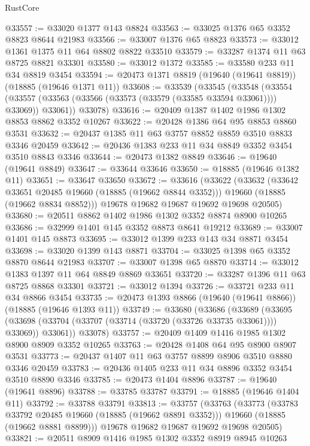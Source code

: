 \begin{lexlean}{RustCore}
\begin{coremodule}
@33557 := @33020 @1377 @143 @8824
@33563 := @33025 @1376 @65 @3352 @8823 @8644 @21983
@33566 := @33007 @1376 @65 @8823
@33573 := @33012 @1361 @1375 @11 @64 @8802 @8822 @33510
@33579 := @33287 @1374 @11 @63 @8725 @8821 @33301
@33580 := @33012 @1372
@33585 := @33580 @233 @11 @34 @8819 @3454
@33594 := @20473 @1371 @8819 (@19640 (@19641 @8819)) (@18885 (@19646 @1371 @11))
@33608 := @33539
    (@33545
      (@33548
        (@33554 (@33557 (@33563 (@33566 (@33573 (@33579 (@33585 @33594 @33061)))) @33069)) @33061))
      @33078)
@33616 := @20409 @1387 @1402 @1986 @1302 @8853 @8862 @3352 @10267
@33622 := @20428 @1386 @64 @95 @8853 @8860 @3531
@33632 := @20437 @1385 @11 @63 @3757 @8852 @8859 @3510 @8833 @3346 @20459
@33642 := @20436 @1383 @233 @11 @34 @8849 @3352 @3454 @3510 @8843 @3346
@33644 := @20473 @1382 @8849
@33646 := @19640 (@19641 @8849)
@33647 := @33644 @33646
@33650 := @18885 (@19646 @1382 @11)
@33651 := @33647 @33650
@33672 := @33616
    (@33622
      (@33632
        (@33642 @33651 @20485 @19660 (@18885 (@19662 @8844 @3352)))
        @19660
        (@18885 (@19662 @8834 @8852)))
      @19678
      @19682
      @19687
      @19692
      @19698
      @20505)
@33680 := @20511 @8862 @1402 @1986 @1302 @3352 @8874 @8900 @10265
@33686 := @32999 @1401 @145 @3352 @8873 @8641 @19212
@33689 := @33007 @1401 @145 @8873
@33695 := @33012 @1399 @233 @143 @34 @8871 @3454
@33698 := @33020 @1399 @143 @8871
@33704 := @33025 @1398 @65 @3352 @8870 @8644 @21983
@33707 := @33007 @1398 @65 @8870
@33714 := @33012 @1383 @1397 @11 @64 @8849 @8869 @33651
@33720 := @33287 @1396 @11 @63 @8725 @8868 @33301
@33721 := @33012 @1394
@33726 := @33721 @233 @11 @34 @8866 @3454
@33735 := @20473 @1393 @8866 (@19640 (@19641 @8866)) (@18885 (@19646 @1393 @11))
@33749 := @33680
    (@33686
      (@33689
        (@33695 (@33698 (@33704 (@33707 (@33714 (@33720 (@33726 @33735 @33061)))) @33069)) @33061))
      @33078)
@33757 := @20409 @1409 @1416 @1985 @1302 @8900 @8909 @3352 @10265
@33763 := @20428 @1408 @64 @95 @8900 @8907 @3531
@33773 := @20437 @1407 @11 @63 @3757 @8899 @8906 @3510 @8880 @3346 @20459
@33783 := @20436 @1405 @233 @11 @34 @8896 @3352 @3454 @3510 @8890 @3346
@33785 := @20473 @1404 @8896
@33787 := @19640 (@19641 @8896)
@33788 := @33785 @33787
@33791 := @18885 (@19646 @1404 @11)
@33792 := @33788 @33791
@33813 := @33757
    (@33763
      (@33773
        (@33783 @33792 @20485 @19660 (@18885 (@19662 @8891 @3352)))
        @19660
        (@18885 (@19662 @8881 @8899)))
      @19678
      @19682
      @19687
      @19692
      @19698
      @20505)
@33821 := @20511 @8909 @1416 @1985 @1302 @3352 @8919 @8945 @10263

\end{coremodule}
\end{lexlean}
